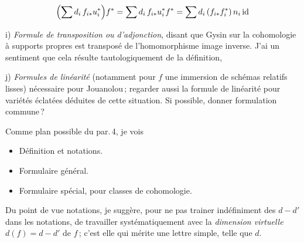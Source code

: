 \documentclass[11pt,a4paper]{article}
\begin{document}


\[
\Bigl(\sum d_i\, f_{i*} u_i^{*}\Bigr) f^{*} = \sum d_i\, f_{i*} u_i^{*} f^{*}
= \sum d_i\, (f_{i*} f_i^{*})\, n_i\, \mathrm{id}
\]

i) \emph{Formule de  transposition ou d'adjonction},
disant que Gysin sur la cohomologie à supports propres est transposé de
l'homomorphisme image inverse. J'ai un sentiment que cela résulte
tautologiquement de la définition, 

j) \emph{Formules de linéarité} (notamment pour $f$ une immersion de
schémas relatifs lisses)\add{,} nécessaire pour Jouanolou\,; regarder aussi
la formule de linéarité pour variétés éclatées déduites de cette
situation. Si possible, donner formulation commune\,?

Comme plan possible du par.\,4, je vois
\begin{itemize}
\item[4.1.] Définition et notations.
\item[4.2.] Formulaire général.
\item[4.3.] Formulaire spécial, pour classes de cohomologie.
\end{itemize}

Du point de vue notations, je suggère, pour ne pas trainer indéfiniment
des $d-d'$ dans les notations, de travailler systématiquement avec la
\emph{dimension virtuelle} $d(f) = d-d'$ de $f$\,; c'est elle qui mérite une
lettre simple, telle que $d$.
\end{document}
